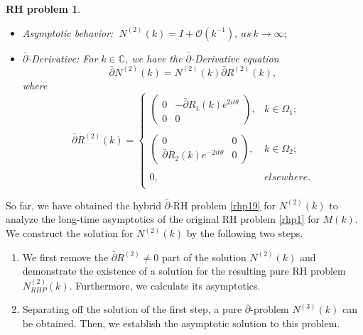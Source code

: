 \documentclass[11pt]{article}
\numberwithin{equation}{section}
\newtheorem{RHP}{RH problem}
\begin{document}
\begin{RHP}
\begin{itemize}
  \item Asymptotic behavior:
  $\ N^{(2)}(k)=I+\mathcal{O}(k^{-1}),\ as \ k\to \infty;$
  \item $\bar{\partial}$-Derivative: For $k\in\mathbb{C}$, we have the $\bar{\partial}$-Derivative equation
\begin{equation}
    \bar{\partial}N^{(2)}(k)=N^{(2)}(k)\bar{\partial}R^{(2)}(k),
\end{equation}
where
  \begin{equation}\label{eq68}
\bar{\partial}R^{(2)}(k)=\left\{\begin{array}{lll}
\left(\begin{array}{cc}
0 & -\bar{\partial}R_{1}(k)e^{2it\theta}\\
0 & 0
\end{array}\right), & k\in \Omega_{1};\\
\\
\left(\begin{array}{cc}
0 & 0\\
\bar{\partial}R_{2}(k)e^{-2it\theta} & 0
\end{array}\right),  &k\in \Omega_{2};\\
\\
0,  &elsewhere.\\
\end{array}\right.
\end{equation}


\end{itemize}
\end{RHP}

So far, we have obtained the hybrid  $\bar{\partial}$-RH problem \ref{rhp19} for  $N^{(2)}(k)$  to analyze the long-time asymptotics of the original RH problem \ref{rhp1} for $M(k)$. We construct the solution for $N^{(2)}(k)$ by the following two steps.
\begin{enumerate}
    \item We first remove the  $\bar{\partial}R^{(2)}\neq0$ part of the solution $N^{(2)}(k)$ and demonstrate the existence of a solution for the resulting pure RH problem $N^{(2)}_{RHP}(k)$. Furthermore, we calculate its asymptotics.
    \item Separating off the solution of the first step,  a pure $\bar{\partial}$-problem $N^{(3)}(k)$ can be obtained. Then, we establish the asymptotic solution to this problem.
\end{enumerate}
\end{document}
